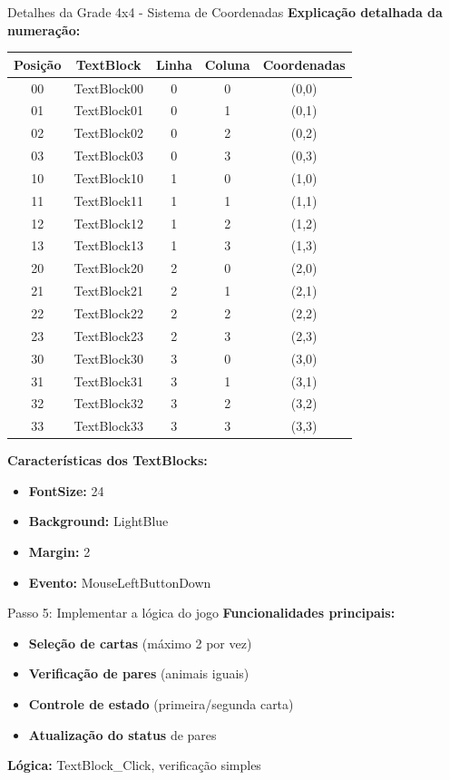 \documentclass[aspectratio=169]{beamer}
\begin{document}
\begin{frame}{Detalhes da Grade 4x4 - Sistema de Coordenadas}
\tiny
\textbf{Explicação detalhada da numeração:}

\begin{center}
\begin{tabular}{|c|c|c|c|c|}
\hline
\textbf{Posição} & \textbf{TextBlock} & \textbf{Linha} & \textbf{Coluna} & \textbf{Coordenadas} \\
\hline
00 & TextBlock00 & 0 & 0 & (0,0) \\
01 & TextBlock01 & 0 & 1 & (0,1) \\
02 & TextBlock02 & 0 & 2 & (0,2) \\
03 & TextBlock03 & 0 & 3 & (0,3) \\
10 & TextBlock10 & 1 & 0 & (1,0) \\
11 & TextBlock11 & 1 & 1 & (1,1) \\
12 & TextBlock12 & 1 & 2 & (1,2) \\
13 & TextBlock13 & 1 & 3 & (1,3) \\
20 & TextBlock20 & 2 & 0 & (2,0) \\
21 & TextBlock21 & 2 & 1 & (2,1) \\
22 & TextBlock22 & 2 & 2 & (2,2) \\
23 & TextBlock23 & 2 & 3 & (2,3) \\
30 & TextBlock30 & 3 & 0 & (3,0) \\
31 & TextBlock31 & 3 & 1 & (3,1) \\
32 & TextBlock32 & 3 & 2 & (3,2) \\
33 & TextBlock33 & 3 & 3 & (3,3) \\
\hline
\end{tabular}
\end{center}

\small
\textbf{Características dos TextBlocks:}
\begin{itemize}
    \item \textbf{FontSize:} 24
    \item \textbf{Background:} LightBlue
    \item \textbf{Margin:} 2
    \item \textbf{Evento:} MouseLeftButtonDown
\end{itemize}
\end{frame}

\begin{frame}{Passo 5: Implementar a lógica do jogo}
\textbf{Funcionalidades principais:}
\begin{itemize}
    \item \textbf{Seleção de cartas} (máximo 2 por vez)
    \item \textbf{Verificação de pares} (animais iguais)
    \item \textbf{Controle de estado} (primeira/segunda carta)
    \item \textbf{Atualização do status} de pares
\end{itemize}

\textbf{Lógica:} TextBlock\_Click, verificação simples
\end{frame}
\end{document}
